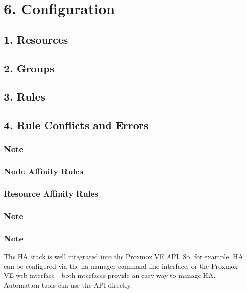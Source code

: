 \section{6. Configuration}

\subsection{1. Resources}

\subsection{2. Groups}

\subsection{3. Rules}

\subsection{4. Rule Conflicts and Errors}

\subsubsection{Note}

\subsubsection{Node Affinity Rules}

\subsubsection{Resource Affinity Rules}

\subsubsection{Note}

\subsubsection{Note}

The HA stack is well integrated into the Proxmox VE API. So, for example, HA can be configured via the ha-manager command-line interface, or the Proxmox VE web interface - both interfaces provide an easy way to manage HA. Automation tools can use the API directly.

